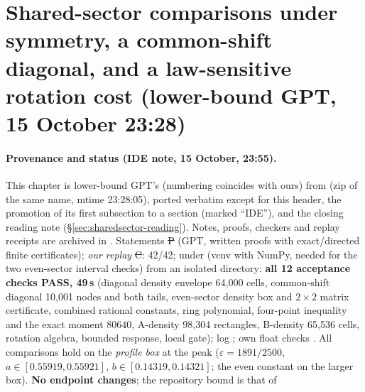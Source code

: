 \section{Shared-sector comparisons under symmetry, a common-shift diagonal, and a law-sensitive rotation cost (lower-bound GPT, 15 October 23:28)}
\label{ch:shared-sector-refinements}

\paragraph{Provenance and status (IDE note, 15 October, 23:55).} This chapter is lower-bound GPT's  (numbering coincides with ours) from
 (zip of the same name, mtime 23:28:05), ported verbatim except for this header, the
promotion of its first subsection to a section (marked ``IDE''), and the closing reading note (\S\ref{sec:sharedsector-reading}). Notes, proofs, checkers and replay receipts are archived in
. Statements \st{P} (GPT, written proofs with exact/directed finite certificates); \emph{our replay} \st{C}:
 42/42;  under  (venv with NumPy, needed for the two even-sector interval checks) from an isolated directory: \textbf{all 12 acceptance checks
PASS, 49\,s} (diagonal density envelope 64,000 cells, common-shift diagonal 10,001 nodes and both tails, even-sector density box and $2\times2$ matrix certificate, combined rational constants, ring
polynomial, four-point inequality and the exact moment $80640$, A-density 98,304 rectangles, B-density 65,536 cells, rotation algebra, bounded response, local gate); log
; own float checks . All comparisons hold on the \emph{profile box} at the peak
($\varepsilon=1891/2500$, $a\in[0.55919,0.55921]$, $b\in[0.14319,0.14321]$; the even constant on the larger box). \textbf{No endpoint changes}; the repository bound is that of
